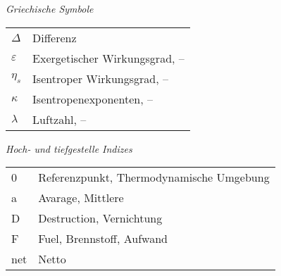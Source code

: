 \vspace{18pt}

\noindent 
\textit{Griechische Symbole}

\vspace{6pt}

\noindent 
\begin{tabular}{@{}p{2cm}l}
	$\Delta$&Differenz\\
	$\varepsilon$&Exergetischer Wirkungsgrad, --\\
	$\eta_s$&Isentroper Wirkungsgrad, --\\
	$\kappa$&Isentropenexponenten, --\\
	$\lambda$&Luftzahl, --\\
\end{tabular}

\vspace{18pt}

\noindent 
\textit{Hoch- und tiefgestelle Indizes}

\vspace{6pt}

\noindent 
\begin{tabular}{@{}p{2cm}l}
	0&Referenzpunkt, Thermodynamische Umgebung\\
	a&Avarage, Mittlere\\
	D&Destruction, Vernichtung\\
	F&Fuel, Brennstoff, Aufwand\\
	net&Netto\\
\end{tabular}

